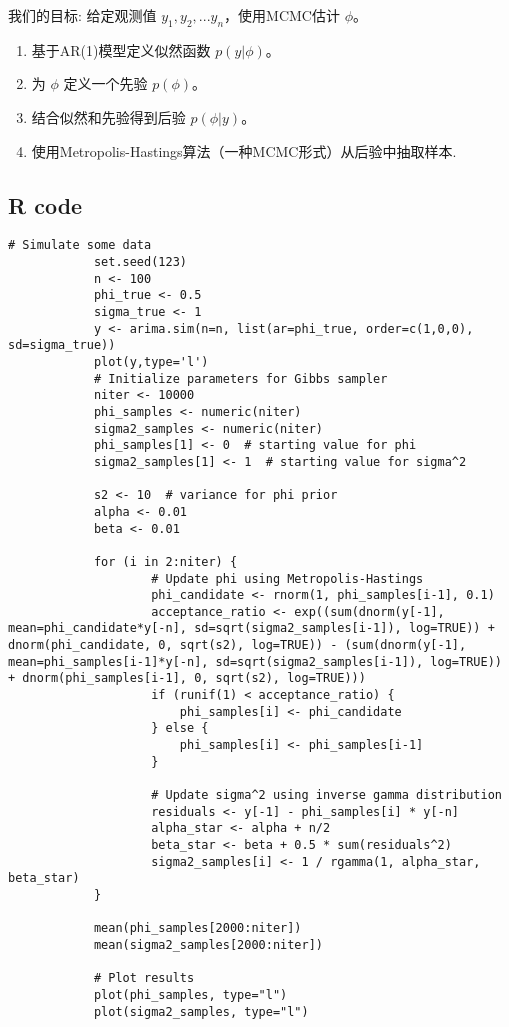 \documentclass[UTF8,12pt]{ctexart}
\numberwithin{equation}{section}%
\begin{document}
	我们的目标: 给定观测值 \( y_1, y_2, ... y_n \)，使用MCMC估计 \( \phi \)。
	
	\begin{tcolorbox}[enhanced,title={步骤}]	
	
	\begin{enumerate}
		\item 基于AR(1)模型定义似然函数 \( p(y|\phi) \)。
		\item 为 \( \phi \) 定义一个先验 \( p(\phi) \)。
		\item 结合似然和先验得到后验 \( p(\phi|y) \)。
		\item 使用Metropolis-Hastings算法（一种MCMC形式）从后验中抽取样本.
	\end{enumerate}
	
	\end{tcolorbox}
	
	\newpage
	\begin{appendices}
		\section{R code}
		\begin{lstlisting}[caption={A MCMC example: R code}, label=lst:r_example, xleftmargin=-2em, xrightmargin=0em]
			# Simulate some data
			set.seed(123)
			n <- 100
			phi_true <- 0.5
			sigma_true <- 1
			y <- arima.sim(n=n, list(ar=phi_true, order=c(1,0,0), sd=sigma_true))
			plot(y,type='l')
			# Initialize parameters for Gibbs sampler
			niter <- 10000
			phi_samples <- numeric(niter)
			sigma2_samples <- numeric(niter)
			phi_samples[1] <- 0  # starting value for phi
			sigma2_samples[1] <- 1  # starting value for sigma^2
			
			s2 <- 10  # variance for phi prior
			alpha <- 0.01
			beta <- 0.01
			
			for (i in 2:niter) {
					# Update phi using Metropolis-Hastings
					phi_candidate <- rnorm(1, phi_samples[i-1], 0.1)
					acceptance_ratio <- exp((sum(dnorm(y[-1], mean=phi_candidate*y[-n], sd=sqrt(sigma2_samples[i-1]), log=TRUE)) + dnorm(phi_candidate, 0, sqrt(s2), log=TRUE)) - (sum(dnorm(y[-1], mean=phi_samples[i-1]*y[-n], sd=sqrt(sigma2_samples[i-1]), log=TRUE)) + dnorm(phi_samples[i-1], 0, sqrt(s2), log=TRUE)))
					if (runif(1) < acceptance_ratio) {
						phi_samples[i] <- phi_candidate
					} else {
						phi_samples[i] <- phi_samples[i-1]
					}
					
					# Update sigma^2 using inverse gamma distribution
					residuals <- y[-1] - phi_samples[i] * y[-n]
					alpha_star <- alpha + n/2
					beta_star <- beta + 0.5 * sum(residuals^2)
					sigma2_samples[i] <- 1 / rgamma(1, alpha_star, beta_star)
			}
			
			mean(phi_samples[2000:niter])
			mean(sigma2_samples[2000:niter])
			
			# Plot results
			plot(phi_samples, type="l")
			plot(sigma2_samples, type="l")
		\end{lstlisting}
		
	\end{appendices}
	
	
	
	\newpage
\end{document}
